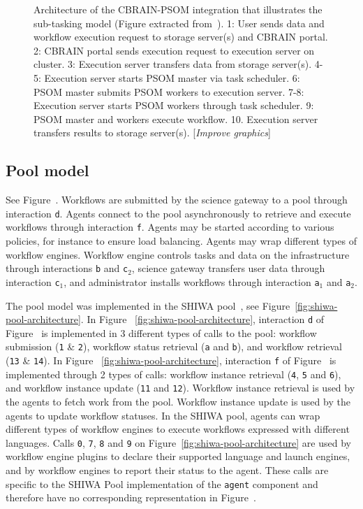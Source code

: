 \documentclass[preprint,3p,twocolumn]{elsarticle}
\newcommand{\todo}[1]{\color{blue}\xspace[\emph{#1}]\xspace\color{black}}
\begin{document}
\begin{figure}
\def\svgwidth{\columnwidth}

\caption{Architecture of the CBRAIN-PSOM integration that illustrates
  the sub-tasking model (Figure extracted from~\cite{GLAT-16}). 1:
  User sends data and workflow execution request to storage server(s)
  and CBRAIN portal. 2: CBRAIN portal sends execution request to
  execution server on cluster. 3: Execution server transfers data from
  storage server(s). 4-5: Execution server starts PSOM master via task
  scheduler. 6: PSOM master submits PSOM workers to execution
  server. 7-8: Execution server starts PSOM workers through task
  scheduler. 9: PSOM master and workers execute workflow. 10.
  Execution server transfers results to storage server(s). \todo{Improve graphics}}
\label{fig:cbrain-psom-architecture}
\end{figure}


\subsection{Pool model}
\label{sec:pool}
See Figure~. Workflows are submitted by the science
gateway to a pool through interaction \texttt{d}. Agents connect to
the pool asynchronously to retrieve and execute workflows through
interaction \texttt{f}. Agents may be started according to various
policies, for instance to ensure load balancing. Agents may wrap
different types of workflow engines. Workflow engine controls tasks
and data on the infrastructure through interactions \texttt{b} and
\texttt{c$_2$}, science gateway transfers user data through
interaction \texttt{c$_1$}, and administrator installs workflows
through interaction \texttt{a$_1$} and \texttt{a$_2$}.

The pool model was implemented in the SHIWA pool~\cite{ROGE-13}, see
Figure~\ref{fig:shiwa-pool-architecture}. In Figure
~\ref{fig:shiwa-pool-architecture}, interaction \texttt{d} of
Figure~ is implemented in 3 different types of calls
to the pool: workflow submission (\texttt{1} \& \texttt{2}), workflow
status retrieval (\texttt{a} and \texttt{b}), and workflow retrieval
(\texttt{13} \& \texttt{14}). In Figure
~\ref{fig:shiwa-pool-architecture}, interaction \texttt{f} of
Figure~ is implemented through 2 types of calls:
workflow instance retrieval (\texttt{4}, \texttt{5} and \texttt{6}),
and workflow instance update (\texttt{11} and \texttt{12}). Workflow
instance retrieval is used by the agents to fetch work from the
pool. Workflow instance update is used by the agents to update
workflow statuses. In the SHIWA pool, agents can wrap different types
of workflow engines to execute workflows expressed with different
languages. Calls \texttt{0}, \texttt{7}, \texttt{8} and \texttt{9} on
Figure~\ref{fig:shiwa-pool-architecture} are used by workflow engine
plugins to declare their supported language and launch engines, and by
workflow engines to report their status to the agent. These calls are
specific to the SHIWA Pool implementation of the \texttt{agent}
component and therefore have no corresponding representation in
Figure~.
\end{document}
